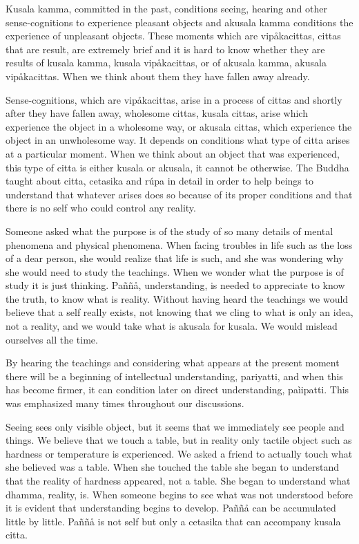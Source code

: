 \documentclass[10pt,a4paper,final]{article}
\begin{document}
Kusala kamma, committed in the past,
conditions seeing, hearing and other sense-cognitions to experience
pleasant objects and akusala kamma conditions the experience of
unpleasant objects. These moments which are vipåkacittas, cittas that
are result, are extremely brief and it is hard to know whether they are
results of kusala kamma, kusala vipåkacittas, or of akusala kamma,
akusala vipåkacittas. When we think about them they have fallen away
already. 

Sense-cognitions, which are vipåkacittas,
arise in a process of cittas and shortly after they have fallen away,
wholesome cittas, kusala cittas, arise which experience the object in a
wholesome way, or akusala cittas, which experience the object in an
unwholesome way. It depends on conditions what type of citta arises at a
particular moment. When we think about an object that was experienced,
this type of citta is either kusala or akusala, it cannot be otherwise.
The Buddha taught about citta, cetasika and rúpa in detail in order to
help beings to understand that whatever arises does so because of its
proper conditions and that there is no self who could control any
reality. 

Someone asked what the purpose is of the
study of so many details of mental phenomena and physical phenomena.
When facing troubles in life such as the loss of a dear person, she
would realize that life is such, and she was wondering why she would
need to study the teachings. When we wonder what the purpose is of study
it is just thinking. Paññå, understanding, is needed to appreciate to
know the truth, to know what is reality. Without having heard the
teachings we would believe that a self really exists, not knowing that
we cling to what is only an idea, not a reality, and we would take what
is akusala for kusala. We would mislead ourselves all the time. 

By hearing the teachings and considering
what appears at the present moment there will be a beginning of
intellectual understanding, pariyatti, and when this has become firmer,
it can condition later on direct understanding, paìipatti. This was
emphasized many times throughout our discussions. 

Seeing sees only visible object, but it
seems that we immediately see people and things. We believe that we
touch a table, but in reality only tactile object such as hardness or
temperature is experienced. We asked a friend to actually touch what she
believed was a table. When she touched the table she began to understand
that the reality of hardness appeared, not a table. She began to
understand what dhamma, reality, is. When someone begins to see what was
not understood before it is evident that understanding begins to
develop. Paññå can be accumulated little by little. Paññå is not self
but only a cetasika that can accompany kusala citta. 
\end{document}
